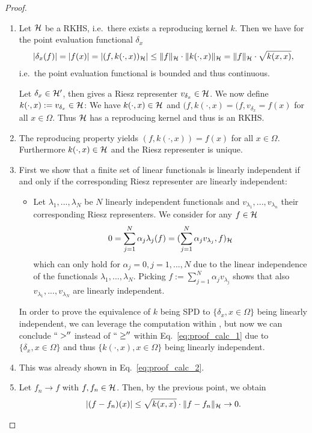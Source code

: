 \begin{proof}
\begin{enumerate}
\item Let $\mathcal{H}$ be a RKHS, i.e.\ there exists a reproducing kernel $k$.
Then we have for the point evaluation functional $\delta_x$
\begin{align}
\label{eq:proof_calc_2}
|\delta_x(f)| = |f(x)| = |(f, k(\cdot, x))_{\mathcal{H}}|
\leq \Vert f \Vert_{\mathcal{H}} \cdot \Vert k(\cdot, x) \Vert_{\mathcal{H}}
=  \Vert f \Vert_{\mathcal{H}} \cdot \sqrt{k(x, x)},
\end{align}
i.e.\ the point evaluation functional is bounded and thus continuous.

Let $\delta_x \in \mathcal{H}'$, then 
 gives a Riesz representer $v_{\delta_x} \in \mathcal{H}$.
We now define $k(\cdot, x) := v_{\delta_x} \in \mathcal{H}$:
We have $k(\cdot, x) \in \mathcal{H}$ and $(f, k(\cdot, x) = (f, v_{\delta_x} = f(x)$ for all $x \in \Omega$.
Thus $\mathcal{H}$ has a reproducing kernel and thus is an RKHS.
\item The reproducing property yields $(f, k(\cdot, x)) = f(x)$ for all $x \in \Omega$. 
Furthermore $k(\cdot, x) \in \mathcal{H}$ and the Riesz representer is unique.
\item First we show that a finite set of linear functionals is linearly independent if and only if the corresponding Riesz representer are linearly independent:
\begin{itemize}
\item[] Let $\lambda_1, ..., \lambda_N$ be $N$ linearly independent functionals and $v_{\lambda_1}, ..., v_{\lambda_n}$ their corresponding Riesz representers.
We consider for any $f \in \mathcal{H}$
\begin{align*}
0 = \sum_{j=1}^N \alpha_j \lambda_j(f) = (\sum_{j=1}^N \alpha_j v_{\lambda_j},  f)_{\mathcal{H}}
\end{align*}
which can only hold for $\alpha_j = 0, j=1, ..., N$ due to the linear independence of the functionals $\lambda_1, ..., \lambda_N$.
Picking $f := \sum_{j=1}^N \alpha_j v_{\lambda_j}$ shows that also $v_{\lambda_1}, ..., v_{\lambda_N}$ are linearly independent.
\end{itemize}
In order to prove the equivalence of $k$ being SPD to $\{\delta_x, x\in\Omega\}$ being linearly independent, 
we can leverage the computation within ,
but now we can conclude $``>''$ instead of $``\geq''$ within Eq.~\eqref{eq:proof_calc_1} due to $\{\delta_x, x\in\Omega\}$ and thus $\{ k(\cdot, x), x \in \Omega \}$ being linearly independent.
\item This was already shown in Eq.~\eqref{eq:proof_calc_2}.
\item Let $f_n \rightarrow f$ with $f, f_n \in \mathcal{H}$.
Then, by the previous point, we obtain
\begin{align*}
|(f-f_n)(x)| \leq \sqrt{k(x, x)} \cdot \Vert f - f_n \Vert_{\mathcal{H}} \rightarrow 0.
\end{align*}

\end{enumerate}
\end{proof}


